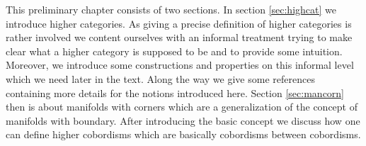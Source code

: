 This preliminary chapter consists of two sections. In section \ref{sec:highcat} we introduce higher categories. As giving a precise definition of higher categories is rather involved we content ourselves with an informal treatment trying to make clear what a higher category is supposed to be and to provide some intuition. Moreover, we introduce some constructions and properties on this informal level which we need later in the text. Along the way we give some references containing more details for the notions introduced here. Section \ref{sec:mancorn} then is about manifolds with corners which are a generalization of the concept of manifolds with boundary. After introducing the basic concept we discuss how one can define higher cobordisms which are basically cobordisms between cobordisms.
